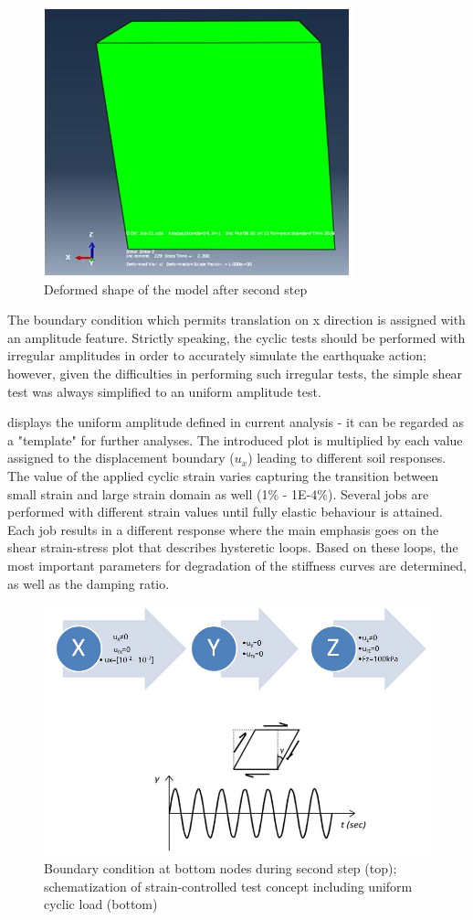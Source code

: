 \documentclass[10pt,a4paper]{report}
\begin{document}
\begin{figure}[h!]
	\centering
	\includegraphics[width=0.33\linewidth]{"deformed"}
	\caption{Deformed shape of the model after second step}
	\label{deformed}
\end{figure}

The boundary condition which permits translation on x direction is assigned with an amplitude feature. Strictly speaking, the cyclic tests should be performed with irregular amplitudes in order to accurately simulate the earthquake action; however, given the difficulties in performing such irregular tests, the simple shear test was always simplified to an uniform amplitude test. 

\label{Figure 16} displays the uniform amplitude defined in current analysis - it can be regarded as a "template" for further analyses. The introduced plot is multiplied by each value assigned to the displacement boundary ($u_x$) leading to different soil responses. The value of the applied cyclic strain varies capturing the transition between small strain and large strain domain as well (1\% -  1E-4\%). Several jobs are performed with different strain values until fully elastic behaviour is attained. Each job results in a different response where the main emphasis goes on the shear strain-stress plot that describes hysteretic loops. Based on these loops, the most important parameters for degradation of the stiffness curves are determined, as well as the damping ratio.
\begin{figure}[h!]
	\centering
	\includegraphics[width=0.7\linewidth]{"bc1d2"}
	\caption{Boundary condition at bottom nodes during second step (top); schematization of strain-controlled test concept including uniform cyclic load (bottom)}
	\label{strain-test}
\end{figure}
\end{document}
